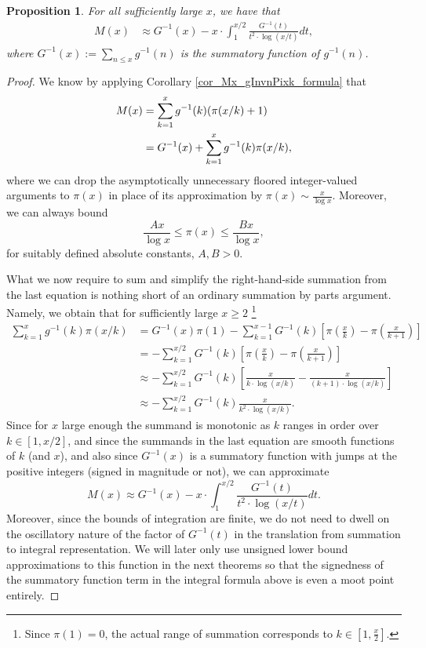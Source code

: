 \documentclass[11pt,reqno,a4letter]{article}
\numberwithin{figure}{section}
\numberwithin{table}{section}
\theoremstyle{plain}
\newtheorem{prop}[theorem]{Proposition}
\numberwithin{theorem}{section}
\theoremstyle{definition}
\begin{document}
\begin{prop}
\label{prop_Mx_SBP_IntegralFormula} 
For all sufficiently large $x$, we have that 
\begin{align} 
\label{eqn_pf_tag_v2-restated_v2} 
M(x) & \approx G^{-1}(x) - x \cdot \int_1^{x/2} \frac{G^{-1}(t)}{t^2 \cdot \log(x/t)} dt, 
\end{align} 
where $G^{-1}(x) := \sum_{n \leq x} g^{-1}(n)$ is the summatory function of $g^{-1}(n)$. 
\end{prop} 
\begin{proof} 
We know by applying Corollary \ref{cor_Mx_gInvnPixk_formula} that 
\begin{align} 
\notag
M(x) & = \sum_{k=1}^{x} g^{-1}(k) (\pi(x/k)+1) \\ 
\notag
     & = G^{-1}(x) + \sum_{k=1}^{x} g^{-1}(k) \pi(x/k), 
\end{align} 
where we can drop the asymptotically unnecessary floored integer-valued arguments to $\pi(x)$ in place of 
its approximation by $\pi(x) \sim \frac{x}{\log x}$. Moreover, we can always 
bound $$\frac{Ax}{\log x} \leq \pi(x) \leq \frac{Bx}{\log x},$$ for suitably defined 
absolute constants, $A,B > 0$. 

What we now require to sum and simplify the right-hand-side summation from the last equation is 
nothing short of an ordinary summation by parts argument. Namely, we obtain that for sufficiently large 
$x \geq 2$ \footnote{
     Since $\pi(1) = 0$, the actual range of summation corresponds to 
     $k \in \left[1, \frac{x}{2}\right]$. 
}
\begin{align*} 
\sum_{k=1}^{x} g^{-1}(k) \pi(x/k) & = G^{-1}(x) \pi(1) - \sum_{k=1}^{x-1} G^{-1}(k) \left[ 
     \pi\left(\frac{x}{k}\right) - \pi\left(\frac{x}{k+1}\right)\right] \\ 
     & = -\sum_{k=1}^{x/2} G^{-1}(k) \left[ 
     \pi\left(\frac{x}{k}\right) - \pi\left(\frac{x}{k+1}\right)\right] \\ 
     & \approx -\sum_{k=1}^{x/2} G^{-1}(k) \left[ 
     \frac{x}{k \cdot \log(x/k)} - \frac{x}{(k+1) \cdot \log(x/k)}\right] \\ 
     & \approx -\sum_{k=1}^{x/2} G^{-1}(k) \frac{x}{k^2 \cdot \log(x/k)}. 
\end{align*} 
Since for $x$ large enough the summand is monotonic as $k$ ranges in order over $k \in [1, x/2]$, and 
since the summands in the last equation are smooth functions of $k$ (and $x$), and also since $G^{-1}(x)$ is 
a summatory function with jumps at the positive integers (signed in magnitude or not), we can approximate 
\[
M(x) \approx G^{-1}(x) - x \cdot \int_1^{x/2} \frac{G^{-1}(t)}{t^2 \cdot \log(x/t)} dt. 
\]
Moreover, since the bounds of integration are finite, we do not need to dwell on the oscillatory nature of the 
factor of $G^{-1}(t)$ in the translation from summation to integral representation. We will 
later only use unsigned lower bound approximations to this function in the next theorems so that 
the signedness of the summatory function term in the integral formula above is even a moot point entirely. 
\end{proof} 
\end{document}
